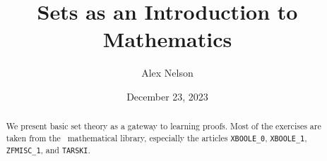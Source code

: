 \documentclass{amsart}
\title{Sets as an Introduction to Mathematics}
\author{Alex Nelson}
\date{December 23, 2023}
\begin{document}
\maketitle
\begin{abstract}
We present basic set theory as a gateway to learning proofs. Most of the
exercises are taken from the \Mizar\ mathematical library, especially
the articles \texttt{XBOOLE\_0}, \texttt{XBOOLE\_1}, \texttt{ZFMISC\_1}, and \texttt{TARSKI}.
\end{abstract}
\tableofcontents









\end{document}

